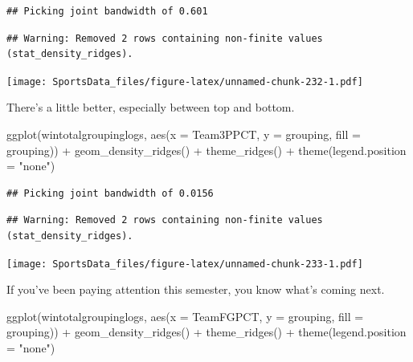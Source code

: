 \documentclass[
]{book}
\newenvironment{Shaded}{\begin{snugshade}}{\end{snugshade}}
\newcommand{\AttributeTok}[1]{\textcolor[rgb]{0.77,0.63,0.00}{#1}}
\newcommand{\FunctionTok}[1]{\textcolor[rgb]{0.00,0.00,0.00}{#1}}
\newcommand{\NormalTok}[1]{#1}
\newcommand{\SpecialCharTok}[1]{\textcolor[rgb]{0.00,0.00,0.00}{#1}}
\newcommand{\StringTok}[1]{\textcolor[rgb]{0.31,0.60,0.02}{#1}}
\begin{document}
\begin{verbatim}
## Picking joint bandwidth of 0.601
\end{verbatim}

\begin{verbatim}
## Warning: Removed 2 rows containing non-finite values (stat_density_ridges).
\end{verbatim}

\texttt{[image: SportsData\_files/figure-latex/unnamed-chunk-232-1.pdf]}

There's a little better, especially between top and bottom.

\begin{Shaded}
\begin{Highlighting}[]
\FunctionTok{ggplot}\NormalTok{(wintotalgroupinglogs, }\FunctionTok{aes}\NormalTok{(}\AttributeTok{x =}\NormalTok{ Team3PPCT, }\AttributeTok{y =}\NormalTok{ grouping, }\AttributeTok{fill =}\NormalTok{ grouping)) }\SpecialCharTok{+}
  \FunctionTok{geom\_density\_ridges}\NormalTok{() }\SpecialCharTok{+}
  \FunctionTok{theme\_ridges}\NormalTok{() }\SpecialCharTok{+} 
  \FunctionTok{theme}\NormalTok{(}\AttributeTok{legend.position =} \StringTok{"none"}\NormalTok{)}
\end{Highlighting}
\end{Shaded}

\begin{verbatim}
## Picking joint bandwidth of 0.0156
\end{verbatim}

\begin{verbatim}
## Warning: Removed 2 rows containing non-finite values (stat_density_ridges).
\end{verbatim}

\texttt{[image: SportsData\_files/figure-latex/unnamed-chunk-233-1.pdf]}

If you've been paying attention this semester, you know what's coming next.

\begin{Shaded}
\begin{Highlighting}[]
\FunctionTok{ggplot}\NormalTok{(wintotalgroupinglogs, }\FunctionTok{aes}\NormalTok{(}\AttributeTok{x =}\NormalTok{ TeamFGPCT, }\AttributeTok{y =}\NormalTok{ grouping, }\AttributeTok{fill =}\NormalTok{ grouping)) }\SpecialCharTok{+}
  \FunctionTok{geom\_density\_ridges}\NormalTok{() }\SpecialCharTok{+}
  \FunctionTok{theme\_ridges}\NormalTok{() }\SpecialCharTok{+} 
  \FunctionTok{theme}\NormalTok{(}\AttributeTok{legend.position =} \StringTok{"none"}\NormalTok{)}
\end{Highlighting}
\end{Shaded}
\end{document}
